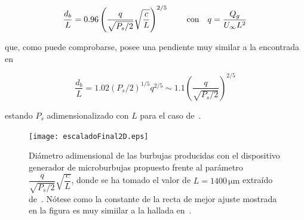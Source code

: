 \begin{equation}
\dfrac{d_{b}}{L} = 0.96\left(\dfrac{q}{\sqrt{P_{s}/2}}\sqrt{\dfrac{c}{L}}\right)^{2/5}\,\qquad \mathrm{con}\quad q = \dfrac{Q_{g}}{U_{\infty}L^{2}}
\LABEQ{leyEscala2D}
\end{equation}

que, como puede comprobarse, posee una pendiente muy similar a la encontrada  en~\cite{Evangelio2015}

\begin{displaymath}
\dfrac{d_{b}}{L} = 1.02\left(P_{s}/2\right)^{1/5}q^{2/5} \sim 1.1\left(\dfrac{q}{\sqrt{P_{s}/2}}\right)^{2/5}
\end{displaymath}

estando $P_{s}$ adimensionalizado con $L$ para el caso de~\cite{Evangelio2015}.


\begin{figure}
\centering
\texttt{[image: escaladoFinal2D.eps]}
\caption{Diámetro adimensional de las burbujas producidas con el dispositivo generador de microburbujas propuesto frente al parámetro $\dfrac{q}{\sqrt{P_{s}/2}}\sqrt{\dfrac{c}{L}}$, donde se ha tomado el valor de $L = 1400\,\mathrm{\mu m}$ extraído de~\cite{Evangelio2015}. Nótese como la constante de la recta de mejor ajuste mostrada en la figura es muy simiilar a la hallada en~\cite{Evangelio2015}.}
\end{figure}




